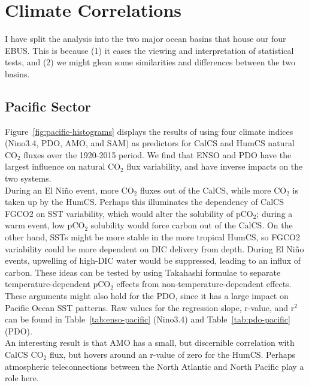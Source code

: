 \documentclass[12pt]{article}
\begin{document}
\section{Climate Correlations}
I have split the analysis into the two major ocean basins that house our four EBUS. This is because (1) it eases the viewing and interpretation of statistical tests, and (2) we might glean some similarities and differences between the two basins. 

\subsection{Pacific Sector}
Figure~\ref{fig:pacific-histograms} displays the results of using four climate indices (Nino3.4, PDO, AMO, and SAM) as predictors for CalCS and HumCS natural CO$_{2}$ fluxes over the 1920-2015 period. We find that ENSO and PDO have the largest influence on natural CO$_{2}$ flux variability, and have inverse impacts on the two systems. \\

During an El Ni\~no event, more CO$_{2}$ fluxes out of the CalCS, while more CO$_{2}$ is taken up by the HumCS. Perhaps this illuminates the dependency of CalCS FGCO2 on SST variability, which would alter the solubility of pCO$_{2}$; during a warm event, low pCO$_{2}$ solubility would force carbon out of the CalCS. On the other hand, SSTs might be more stable in the more tropical HumCS, so FGCO2 variability could be more dependent on DIC delivery from depth. During El Ni\~no events, upwelling of high-DIC water would be suppressed, leading to an influx of carbon. These ideas can be tested by using Takahashi formulae to separate temperature-dependent pCO$_{2}$ effects from non-temperature-dependent effects. These arguments might also hold for the PDO, since it has a large impact on Pacific Ocean SST patterns. Raw values for the regression slope, r-value, and r$^{2}$ can be found in Table~\ref{tab:enso-pacific} (Nino3.4) and Table~\ref{tab:pdo-pacific} (PDO). \\

An interesting result is that AMO has a small, but discernible correlation with CalCS CO$_{2}$ flux, but hovers around an r-value of zero for the HumCS. Perhaps atmospheric teleconnections between the North Atlantic and North Pacific play a role here.
 
\end{document}
